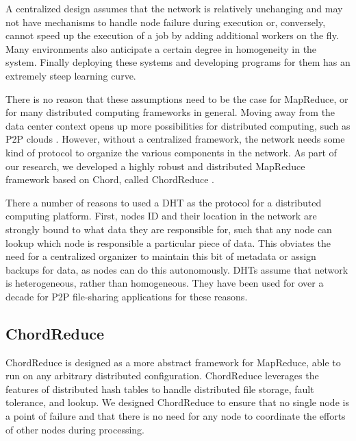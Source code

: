 A centralized design assumes that the network is relatively unchanging and may not have mechanisms to handle node failure during execution or, conversely, cannot speed up the execution of a job by adding additional workers on the fly.  
Many environments also anticipate a certain degree in homogeneity in the system.
Finally deploying these systems and developing programs for them has an extremely steep learning curve.

There is no reason that these assumptions need to be the case for MapReduce, or for many distributed computing frameworks in general.
Moving away from the data center context opens up more possibilities for distributed computing, such as P2P clouds \cite{p2p-cloud}.
However, without a centralized framework, the network needs some kind of protocol to organize the various components in the network.
As part of our research, we developed a highly robust and distributed MapReduce framework based on Chord, called ChordReduce \cite{chordreduce}.

There a number of reasons to used a DHT as the protocol for a distributed computing platform.
First, nodes ID and their location in the network are strongly bound to what data they are responsible for, such that any node can lookup which node is responsible a particular piece of data.
This obviates the need for a centralized organizer to maintain this bit of metadata or assign backups for data, as nodes can do this autonomously.
DHTs assume that network is heterogeneous, rather than homogeneous.
They have been used for over a decade for P2P file-sharing applications for these reasons.




\subsection{ChordReduce}

ChordReduce is designed as a more abstract framework for MapReduce, able to run on any arbitrary distributed configuration.
ChordReduce leverages the features of distributed hash tables to handle distributed file storage, fault tolerance, and lookup.  
We designed ChordReduce to ensure that no single node is a point of failure and that there is no need for any node to coordinate the efforts of other nodes during processing.



